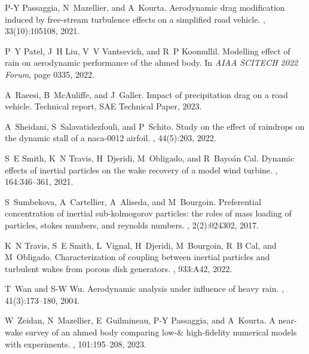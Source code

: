 \documentclass[doublecol]{epl2}
\begin{document}
\begin{thebibliography}{10}
P-Y Passaggia, N~Mazellier, and A~Kourta.
\newblock Aerodynamic drag modification induced by free-stream turbulence
  effects on a simplified road vehicle.
, 33(10):105108, 2021.

P~Y Patel, J~H Liu, V~V Vantsevich, and R~P Koomullil.
\newblock Modelling effect of rain on aerodynamic performance of the ahmed
  body.
\newblock In {\em AIAA SCITECH 2022 Forum}, page 0335, 2022.

A~Raeesi, B~McAuliffe, and J~Galler.
\newblock Impact of precipitation drag on a road vehicle.
\newblock Technical report, SAE Technical Paper, 2023.

A~Sheidani, S~Salavatidezfouli, and P~Schito.
\newblock Study on the effect of raindrops on the dynamic stall of a naca-0012
  airfoil.
, 44(5):203, 2022.

S~E Smith, K~N Travis, H~Djeridi, M~Obligado, and R~Bayo{\'a}n Cal.
\newblock Dynamic effects of inertial particles on the wake recovery of a model
  wind turbine.
, 164:346--361, 2021.

S~Sumbekova, A~Cartellier, A~Aliseda, and M~Bourgoin.
\newblock Preferential concentration of inertial sub-kolmogorov particles: the
  roles of mass loading of particles, stokes numbers, and reynolds numbers.
, 2(2):024302, 2017.

K~N Travis, S~E Smith, L~Vignal, H~Djeridi, M~Bourgoin, R~B Cal, and
  M~Obligado.
\newblock Characterization of coupling between inertial particles and turbulent
  wakes from porous disk generators.
, 933:A42, 2022.

T~Wan and S-W Wu.
\newblock Aerodynamic analysis under influence of heavy rain.
,
  41(3):173--180, 2004.

W~Zeidan, N~Mazellier, E~Guilmineau, P-Y Passaggia, and A~Kourta.
\newblock A near-wake survey of an ahmed body comparing low-\& high-fidelity
  numerical models with experiments.
, 101:195--208, 2023.

\end{thebibliography}
\end{document}
